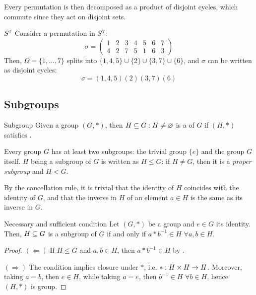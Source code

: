 Every permutation is then decomposed as a product of disjoint cycles, which commute since they act on disjoint sets.

\begin{example}{$ S^{7} $}{}
  Consider a permutation in $ S^{7} $:
  \begin{equation*}
    \sigma =
    \begin{pmatrix}
      1 & 2 & 3 & 4 & 5 & 6 & 7 \\
      4 & 2 & 7 & 5 & 1 & 6 & 3
    \end{pmatrix}
  \end{equation*}
  Then, $ \Omega = \{1 , \dots , 7\} $ splits into $ \{1,4,5\} \cup \{2\} \cup \{3,7\} \cup \{6\} $, and $ \sigma $ can be written as disjoint cycles:
  \begin{equation*}
    \sigma = (1,4,5) (2) (3,7) (6)
  \end{equation*}
\end{example}

\subsection{Subgroups}

\begin{definition}{Subgroup}{}
  Given a group $ (G,*) $, then $ H \subseteq G : H \neq \varnothing $ is a  of $ G $ if $ (H,*) $ satisfies .
\end{definition}

Every group $ G $ has at least two subgroups: the trivial group $ \{e\} $ and the group $ G $ itself. $ H $ being a subgroup of $ G $ is written as $ H \leq G $: if $ H \neq G $, then it is a \emph{proper subgroup} and $ H < G $.

By the cancellation rule, it is trivial that the identity of $ H $ coincides with the identity of $ G $, and that the inverse in $ H $ of an element $ a \in H $ is the same as its inverse in $ G $.

\begin{lemma}{Necessary and sufficient condition}{}
  Let $ (G , *) $ be a group and $ e \in G $ its identity. Then, $ H \subseteq G $ is a subgroup of $ G $ if and only if $ a * b^{-1} \in H \,\, \forall a,b \in H $.
\end{lemma}

\begin{proofbox}
  \begin{proof}
    $ (\Leftarrow) $ If $ H \leq G $ and $ a,b \in H $, then $ a * b^{-1} \in H $ by .

    $ (\Rightarrow) $ The condition implies closure under $ * $, i.e. $ * : H \times H \rightarrow H $. Moreover, taking $ a = b $, then $ e \in H $, while taking $ a = e $, then $ b^{-1} \in H \,\,\forall b \in H $, hence $ (H , *) $ is group.
  \end{proof}
\end{proofbox}

